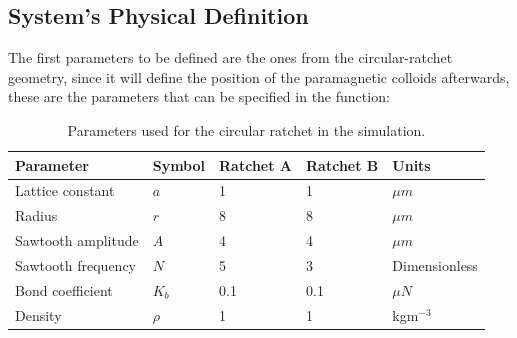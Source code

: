 \subsection{System's Physical Definition}

The first parameters to be defined are the ones from the circular-ratchet geometry, since it will define the position of the paramagnetic colloids afterwards, these are the parameters that can be specified in the function:

\begin{table}[H]
\centering
\caption[Ratchet physical parameters.]{Parameters used for the circular ratchet in the simulation.}
\begin{tabular}{l l l l l}
\hline
Parameter & Symbol & Ratchet A & Ratchet B & Units \\
\hline
Lattice constant & \(a\) & 1 & 1 & \(\mu m\) \\
Radius & \( r\) & 8 & 8 & \( \mu m\) \\
Sawtooth amplitude & \( A\) & 4 & 4 & \( \mu m\) \\
Sawtooth frequency & \( N\) & 5 & 3 & Dimensionless\\
Bond coefficient & \( K_b\) & 0.1 & 0.1 & \( \mu N\) \\ 
Density & \(\rho\) & 1 & 1 & kgm\(^{-3}\) \\
\hline
\end{tabular}
\end{table}

